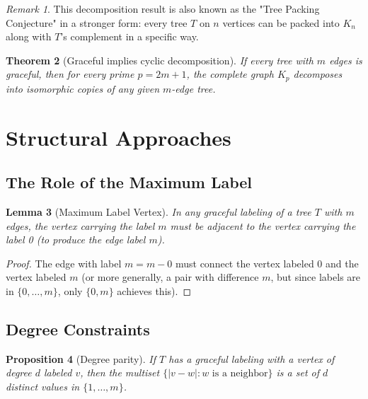 \documentclass[12pt,a4paper]{amsart}
\newtheorem{theorem}{Theorem}[section]
\newtheorem{lemma}[theorem]{Lemma}
\newtheorem{proposition}[theorem]{Proposition}
\theoremstyle{definition}
\theoremstyle{remark}
\newtheorem{remark}[theorem]{Remark}
\begin{document}
\begin{remark}
This decomposition result is also known as the "Tree Packing Conjecture" in a
stronger form: every tree $T$ on $n$ vertices can be packed into $K_n$ along with
$T$'s complement in a specific way.
\end{remark}

\begin{theorem}[Graceful implies cyclic decomposition]\label{thm:graceful_cyclic}
If every tree with $m$ edges is graceful, then for every prime $p = 2m+1$, the
complete graph $K_p$ decomposes into isomorphic copies of any given $m$-edge tree.
\end{theorem}

\section{Structural Approaches}\label{sec:structural}

\subsection{The Role of the Maximum Label}

\begin{lemma}[Maximum Label Vertex]\label{lem:max_label}
In any graceful labeling of a tree $T$ with $m$ edges, the vertex carrying the
label $m$ must be adjacent to the vertex carrying the label 0
(to produce the edge label $m$).
\end{lemma}

\begin{proof}
The edge with label $m = m - 0$ must connect the vertex labeled 0 and the vertex
labeled $m$ (or more generally, a pair with difference $m$, but since labels are
in $\{0, \ldots, m\}$, only $\{0, m\}$ achieves this).
\end{proof}

\subsection{Degree Constraints}

\begin{proposition}[Degree parity]\label{prop:degree_parity}
If $T$ has a graceful labeling with a vertex of degree $d$ labeled $v$, then
the multiset $\{|v - w| : w \text{ is a neighbor}\}$ is a set of $d$ distinct
values in $\{1, \ldots, m\}$.
\end{proposition}
\end{document}
